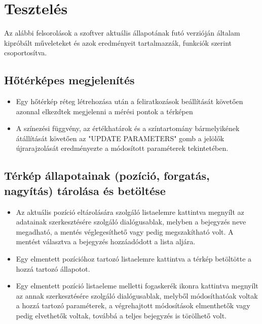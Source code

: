 \section{Tesztelés}

Az alábbi felsorolások a szoftver aktuális állapotának futó verzióján általam
kipróbált műveleteket és azok eredményeit tartalmazzák, funkciók szerint
csoportosítva.

\subsection{Hőtérképes megjelenítés}

\begin{itemize}

  \item Egy hőtérkép réteg létrehozása után a feliratkozások beállítását
  követően azonnal elkezdtek megjelenni a mérési pontok a térképen

  \item A színezési függvény, az értékhatárok és a színtartomány bármelyikének
  átállítását követően az "UPDATE PARAMETERS" gomb a jelölők újrarajzolását
  eredményezte a módosított paraméterek tekintetében.

\end{itemize}


\subsection{Térkép állapotainak (pozíció, forgatás, nagyítás) tárolása és betöltése}

\begin{itemize}

  \item Az aktuális pozíció eltárolására szolgáló listaelemre kattintva megnyílt
  az adatainak szerkesztésére szolgáló dialógusablak, melyben a bejegyzés neve
  megadható, a mentés véglegesíthető vagy pedig megszakítható volt. A mentést
  választva a bejegyzés hozzáadódott a lista aljára.

  \item Egy elmentett pozícióhoz tartozó listaelemre kattintva a térkép
  betöltötte a hozzá tartozó állapotot.

  \item Egy elmentett pozíció listaeleme melletti fogaskerék ikonra kattintva
  megnyílt az annak szerkesztésére szolgáló dialógusablak, melyből
  módosíthatóak voltak a hozzá tartozó paraméterek, a végrehajtott módosítások
  elmenthetők vagy pedig elvethetők voltak, továbbá a teljes bejegyzés is
  törölhető volt.

\end{itemize}


